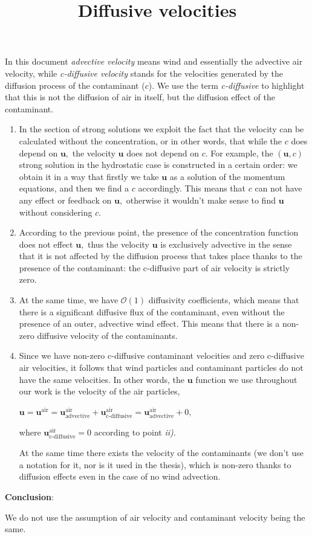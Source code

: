 \documentclass[11pt]{article}
\title{Diffusive velocities}
\date{}
\begin{document}
In this document \textit{advective velocity} means wind and essentially the advective air velocity, while \textit{c-diffusive velocity} stands for the velocities generated by the diffusion process of the contaminant ($c$). We use the term \textit{c-diffusive} to highlight that this is not the diffusion of air in itself, but the diffusion effect of the contaminant.

\begin{enumerate}

  \item In the section of strong solutions we exploit the fact that the velocity can be calculated without the concentration, or in other words, that while the $c$ does depend on $\mathbf{u},$ the velocity $\mathbf{u}$ does not depend on $c.$ For example, the $(\mathbf{u}, c)$ strong solution in the hydrostatic case is constructed in a certain order: we obtain it in a way that firstly we take $\mathbf{u}$ as a solution of the momentum equations, and then we find a $c$ accordingly. This means that $c$ can not have any effect or feedback on $\mathbf{u},$ otherwise it wouldn't make sense to find $\mathbf{u}$ without considering $c.$
  
  \item According to the previous point, the presence of the concentration function does not effect $\mathbf{u},$ thus the velocity $\mathbf{u}$ is exclusively advective in the sense that it is not affected by the diffusion process that takes place thanks to the presence of the contaminant: the c-diffusive part of air velocity is strictly zero.
  
  \item At the same time, we have $\mathcal{O}(1)$ diffusivity coefficients, which means that there is a significant diffusive flux of the contaminant, even without the presence of an outer, advective wind effect. This means that there is a non-zero diffusive velocity of the contaminants.
  
  \item Since we have non-zero c-diffusive contaminant velocities and zero c-diffusive air velocities, it follows that wind particles and contaminant particles do not have the same velocities. In other words, the $\mathbf{u}$ function we use throughout our work is the velocity of the air particles,
  
  $\mathbf{u} = \mathbf{u}^{\text{air}} = \mathbf{u}^{\text{air}}_{\text{advective}} + \mathbf{u}^{\text{air}}_{\text{c-diffusive}} = \mathbf{u}^{\text{air}}_{\text{advective}} + 0,$
  
  where $\mathbf{u}^{\text{air}}_{\text{c-diffusive}} = 0$ according to point \textit{ii)}.
  
  At the same time there exists the velocity of the contaminants (we don't use a notation for it, nor is it used in the thesis), which is non-zero thanks to diffusion effects even in the case of no wind advection.
  
\end{enumerate}

\textbf{Conclusion}:

We do not use the assumption of air velocity and contaminant velocity being the same.
\end{document}
